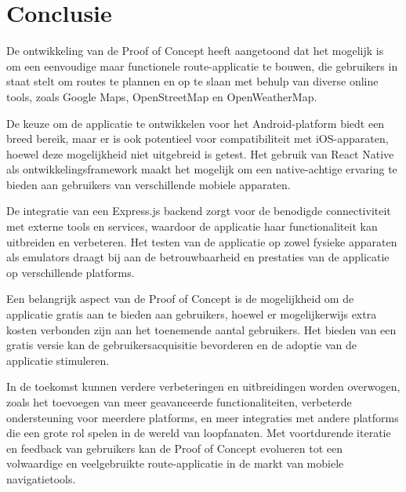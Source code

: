 
\chapter{Conclusie}%
\label{ch:conclusie}


De ontwikkeling van de Proof of Concept heeft aangetoond dat het mogelijk is om een eenvoudige maar functionele route-applicatie te bouwen, die gebruikers in staat stelt om routes te plannen en op te slaan met behulp van diverse online tools, zoals Google Maps, OpenStreetMap en OpenWeatherMap.

De keuze om de applicatie te ontwikkelen voor het Android-platform biedt een breed bereik, maar er is ook potentieel voor compatibiliteit met iOS-apparaten, hoewel deze mogelijkheid niet uitgebreid is getest. Het gebruik van React Native als ontwikkelingsframework maakt het mogelijk om een native-achtige ervaring te bieden aan gebruikers van verschillende mobiele apparaten.

De integratie van een Express.js backend zorgt voor de benodigde connectiviteit met externe tools en services, waardoor de applicatie haar functionaliteit kan uitbreiden en verbeteren. Het testen van de applicatie op zowel fysieke apparaten als emulators draagt bij aan de betrouwbaarheid en prestaties van de applicatie op verschillende platforms.

Een belangrijk aspect van de Proof of Concept is de mogelijkheid om de applicatie gratis aan te bieden aan gebruikers, hoewel er mogelijkerwijs extra kosten verbonden zijn aan het toenemende aantal gebruikers. Het bieden van een gratis versie kan de gebruikersacquisitie bevorderen en de adoptie van de applicatie stimuleren.

In de toekomst kunnen verdere verbeteringen en uitbreidingen worden overwogen, zoals het toevoegen van meer geavanceerde functionaliteiten, verbeterde ondersteuning voor meerdere platforms, en meer integraties met andere platforms die een grote rol spelen in de wereld van loopfanaten. Met voortdurende iteratie en feedback van gebruikers kan de Proof of Concept evolueren tot een volwaardige en veelgebruikte route-applicatie in de markt van mobiele navigatietools.



